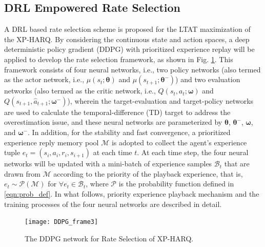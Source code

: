\documentclass[lettersize,journal]{IEEEtran}
\begin{document}
\subsection{DRL Empowered Rate Selection }%
A DRL based rate selection scheme is proposed for the LTAT maximization of the XP-HARQ. By considering the continuous state and action spaces, a deep deterministic policy gradient (DDPG) with prioritized experience replay will be applied to develop the rate selection framework, as shown in Fig. \ref{Fig.DDPG_framework}. This framework consists of four neural networks, i.e., two policy networks (also termed as the actor network, i.e., $\mu(s_t;\boldsymbol{\theta})$ and $\mu(s_{t+1};\boldsymbol{\theta}^-)$) and two evaluation networks (also termed as the critic network, i.e., $Q(s_t,a_t;\boldsymbol{\omega})$ and $Q(s_{t+1},\hat a_{t+1};\boldsymbol{\omega}^-)$), wherein the target-evaluation and target-policy networks are used to calculate the temporal-difference (TD) target to address the overestimation issue, and these neural networks are parameterized by $\boldsymbol{\theta}$, $\boldsymbol{\theta}^-$, $\boldsymbol{\omega}$, and $\boldsymbol{\omega}^-$. In addition, for the stability and fast convergence, a prioritized experience reply memory pool $\mathcal {M}$ is adopted to collect the agent's experience tuple $e_t = (s_i,a_i,r_i,s_{i+1})$ at each time $t$. At each time step, the four neural networks will be updated with a mini-batch of experience samples $\mathcal B_t$ that are drawn from $\mathcal {M}$ according to the priority of the playback experience, that is, $e_t \sim  \mathcal P (\mathcal M) $ for $\forall e_t \in \mathcal B_t$, where $\mathcal P $ is the probability function defined in \eqref{eqn:prob_def}.
In what follows, priority experience playback mechanism and the training processes of the four neural networks are described in detail.

\begin{figure}[htbp]
    \centering
    \texttt{[image: DDPG\_frame3]}
    \caption{The DDPG network for Rate Selection of XP-HARQ.}
    \label{Fig.DDPG_framework} %
\end{figure}
\end{document}

